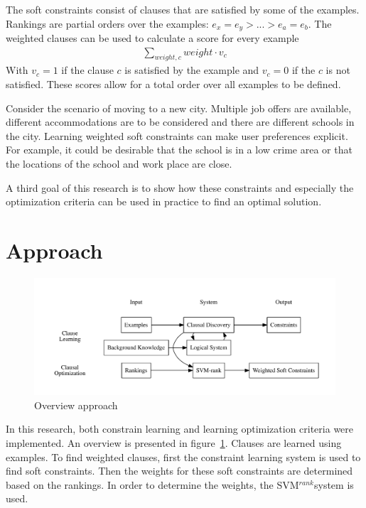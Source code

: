 \documentclass{llncs}
\newcommand{\svm}{SVM$^{rank}$}
\begin{document}
The soft constraints consist of clauses that are satisfied by some of the examples.
Rankings are partial orders over the examples: $e_x = e_y > ... > e_a = e_b$.
The weighted clauses can be used to calculate a score for every example
\begin{eqnarray*}
  \sum\limits_{\mathit{weight}, \mathit{c}} \mathit{weight} \cdot v_{c}
\end{eqnarray*}
With $v_c = 1$ if the clause $c$ is satisfied by the example and $v_c = 0$ if the $c$ is not satisfied.
These scores allow for a total order over all examples to be defined. 

\begin{example}
  Consider the scenario of moving to a new city.
  Multiple job offers are available, different accommodations are to be considered and there are different schools in the city.
  Learning weighted soft constraints can make user preferences explicit.
  For example, it could be desirable that the school is in a low crime area or that the locations of the school and work place are close.
\end{example}

A third goal of this research is to show how these constraints and especially the optimization criteria can be used in practice to find an optimal solution.

\section{Approach}
\begin{figure}

  \centering
    \includegraphics[width=0.8\linewidth]{ApproachOverview.pdf}
  \caption{Overview approach}
  \label{fig:struktuur}

\end{figure}

In this research, both constrain learning and learning optimization criteria were implemented.
An overview is presented in figure~\ref{fig:struktuur}.
Clauses are learned using examples.
To find weighted clauses, first the constraint learning system is used to find soft constraints.
Then the weights for these soft constraints are determined based on the rankings.
In order to determine the weights, the \svm system is used.
\end{document}
